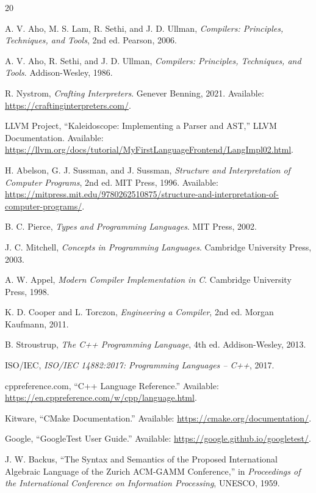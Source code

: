 \documentclass[conference]{IEEEtran}
\begin{document}
\begin{thebibliography}{20}

A. V. Aho, M. S. Lam, R. Sethi, and J. D. Ullman,
\emph{Compilers: Principles, Techniques, and Tools},
2nd ed. Pearson, 2006.

A. V. Aho, R. Sethi, and J. D. Ullman,
\emph{Compilers: Principles, Techniques, and Tools}.
Addison-Wesley, 1986.

R. Nystrom,
\emph{Crafting Interpreters}.
Genever Benning, 2021.
Available: \url{https://craftinginterpreters.com/}.

LLVM Project,
``Kaleidoscope: Implementing a Parser and AST,''
LLVM Documentation.
Available: \url{https://llvm.org/docs/tutorial/MyFirstLanguageFrontend/LangImpl02.html}.

H. Abelson, G. J. Sussman, and J. Sussman,
\emph{Structure and Interpretation of Computer Programs},
2nd ed. MIT Press, 1996.
Available: \url{https://mitpress.mit.edu/9780262510875/structure-and-interpretation-of-computer-programs/}.

B. C. Pierce,
\emph{Types and Programming Languages}.
MIT Press, 2002.

J. C. Mitchell,
\emph{Concepts in Programming Languages}.
Cambridge University Press, 2003.

A. W. Appel,
\emph{Modern Compiler Implementation in C}.
Cambridge University Press, 1998.

K. D. Cooper and L. Torczon,
\emph{Engineering a Compiler},
2nd ed. Morgan Kaufmann, 2011.

B. Stroustrup,
\emph{The C++ Programming Language},
4th ed. Addison-Wesley, 2013.

ISO/IEC,
\emph{ISO/IEC 14882:2017: Programming Languages -- C++},
2017.

cppreference.com,
``C++ Language Reference.''
Available: \url{https://en.cppreference.com/w/cpp/language.html}.

Kitware,
``CMake Documentation.''
Available: \url{https://cmake.org/documentation/}.

Google,
``GoogleTest User Guide.''
Available: \url{https://google.github.io/googletest/}.

J. W. Backus,
``The Syntax and Semantics of the Proposed International
Algebraic Language of the Zurich ACM-GAMM Conference,''
in \emph{Proceedings of the International Conference on
Information Processing}, UNESCO, 1959.


\end{thebibliography}
\end{document}
